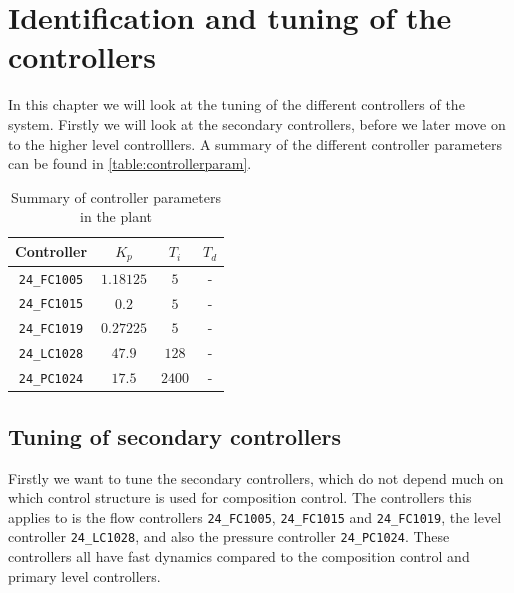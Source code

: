 \chapter{Identification and tuning of the controllers}\label{ch:tuning}
In this chapter we will look at the tuning of the different controllers of the system. Firstly we will look at the secondary controllers, before we later move on to the higher level controlllers. A summary of the different controller parameters can be found in \autoref{table:controllerparam}.

\begin{table}[h]
	\caption{Summary of controller parameters in the plant}
	\label{table:controllerparam}
	\begin{center}
	\begin{tabular}{|c|c|c|c|}
	\hline
	Controller & $K_p$ & $T_i$ & $T_d$ \\
	\hline
	\texttt{24\_FC1005} & $1.18125$ & $5$ & - \\
	\texttt{24\_FC1015} & $0.2$ & $5$ & -\\
	\texttt{24\_FC1019} & $0.27225$ & $5$ & - \\
	\texttt{24\_LC1028} & $47.9$ & $128$ & - \\
	\texttt{24\_PC1024} & $17.5$ & $2400$ & -
	\end{tabular}
	\end{center}
\end{table}

\section{Tuning of secondary controllers}\label{sec:tuning_secondary}
Firstly we want to tune the secondary controllers, which do not depend much on which control structure is used for composition control. The controllers this applies to is the flow controllers \texttt{24\_FC1005}, \texttt{24\_FC1015} and \texttt{24\_FC1019}, the level controller \texttt{24\_LC1028}, and also the pressure controller \texttt{24\_PC1024}. These controllers all have fast dynamics compared to the composition control and primary level controllers.

